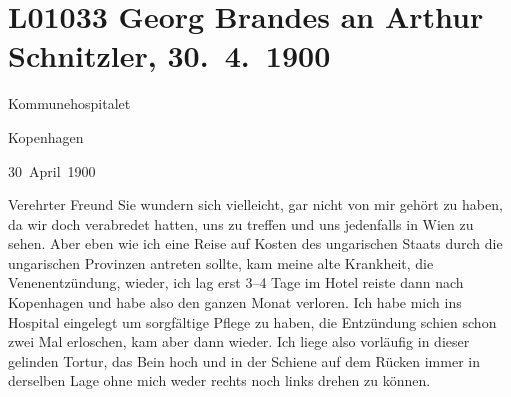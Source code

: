 

\section[Georg Brandes an Arthur Schnitzler, 30. 4. 1900]{L01033 Georg Brandes an Arthur Schnitzler, 30. 4. 1900}
\nopagebreak{}
\rehead{ }\normalsize\beginnumbering{}
\toendnotes[C]{\smallbreak\pagebreak[2]}
\toendnotes[C]{\smallbreak}
\pstart
           \raggedleft{}{\pb}Kommunehospitalet\pend
           
\pstart
           \raggedleft{}Kopenhagen\pend
           
\pstart
           \raggedleft{}30 April 1900\pend
           
\pstart{}Verehrter Freund\pend\vspace{0.5em}
\pstart
           Sie wundern sich vielleicht, gar nicht von mir gehört zu haben, da wir doch
               verabredet hatten, uns zu treffen und uns jedenfalls in Wien zu sehen. Aber eben wie ich eine Reise auf Kosten des ungarischen Staats durch die ungarischen Provinzen antreten sollte, kam meine alte Krankheit,
               die Venenentzündung, wieder, ich lag erst 3–4 Tage im Hotel reiste dann nach Kopenhagen und habe also den ganzen Monat
               verloren. Ich habe mich ins Hospital eingelegt um sorgfältige Pflege zu haben, die
               Entzündung schien schon zwei Mal erloschen, kam aber dann wieder. Ich liege also
               vorläufig in dieser gelinden Tortur, das Bein hoch und in der Schiene {\pb}auf dem Rücken immer in derselben
               Lage ohne mich weder rechts noch links drehen zu können.\pend
           
